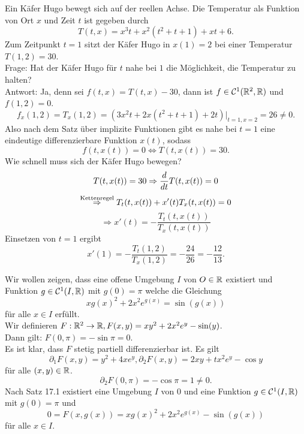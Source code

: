 \documentclass[../ana2u.tex]{subfiles}
\begin{document}
\begin{bsp}
    Ein Käfer Hugo bewegt sich auf der reellen Achse. Die Temperatur 
    als Funktion von Ort \(x\) und Zeit \(t\) ist gegeben durch
    \[ T(t,x) = x^3t+x^2(t^2+t+1)+xt+6. \]
    Zum Zeitpunkt \( t=1 \) sitzt der Käfer Hugo in \( x(1) = 2 \) 
    bei einer Temperatur \(T(1,2) = 30\).\\
    Frage: Hat der Käfer Hugo für \(t\) nahe bei \(1\) die Möglichkeit,
    die Temperatur zu halten?\\
    Antwort: Ja, denn sei \(f(t,x) = T(t,x) - 30\), dann ist
    \(f \in \mathcal{C}^1(\mathbb{R}^2, \mathbb{R}) \) und \(f(1,2) = 0\).
    \[ f_x(1,2) = T_x(1,2) = (3x^2t + 2x(t^2+t+1)+2t)\vert_{t=1, x=2} = 26 \neq 0. \]
    Also nach dem Satz über implizite Funktionen gibt es nahe bei
    \(t=1\) eine eindeutige differenzierbare Funktion \(x(t)\), sodass
    \[ f(t, x(t)) = 0 \Leftrightarrow T(t, x(t)) = 30. \]
    Wie schnell muss sich der Käfer Hugo bewegen?
    \[ T(t,x(t)) = 30 \Rightarrow \frac{d}{dt} T(t,x(t)) = 0 \]
    \[ \overset{\text{Kettenregel}}{\Rightarrow} T_t(t,x(t)) + x'(t)T_x(t,x(t)) = 0 \]
    \[ \Rightarrow x'(t) = -\frac{T_t(t,x(t))}{T_x(t,x(t))} \]
    Einsetzen von \(t=1\) ergibt 
    \[ x'(1) = - \frac{T_t(1,2)}{T_x(1,2)} = - \frac{24}{26} = -\frac{12}{13}. \]
\end{bsp}
\begin{bsp}
    Wir wollen zeigen, dass eine offene Umgebung \(I\) von \(O \in \mathbb{R}\)
    existiert und Funktion \( g \in \mathcal{C}^1(I, \mathbb{R}) \)
    mit \(g(0) = \pi\) welche die Gleichung
    \[ xg(x)^2 + 2x^2 e^{g(x)} = \sin(g(x)) \]
    für alle \(x \in I\) erfüllt.\\
    Wir definieren \( F:\mathbb{R}^2\rightarrow \mathbb{R}, F(x,y) = xy^2 + 2x^2 e^y - \sin(y) \).\\
    Dann gilt: \( F(0, \pi) = -\sin \pi = 0 \).\\
    Es ist klar, dass \( F \) stetig partiell differenzierbar ist.
    Es gilt 
    \[ \partial_1 F(x,y) = y^2+4xe^y, \partial_2 F(x,y) = 2xy+tx^2e^y-\cos y \]
    für alle \( (x,y) \in \mathbb{R} \).
    \[ \partial_2 F(0, \pi) = -\cos \pi = 1 \neq 0. \]
    Nach Satz 17.1 existiert eine Umgebung \(I\) von \(0\) 
    und eine Funktion \( g \in \mathcal{C}^1(I,\mathbb{R}) \) mit 
    \( g(0) = \pi \) und 
    \[ 0 = F(x,g(x)) = xg(x)^2 + 2x^2 e^{g(x)} - \sin(g(x)) \]
    für alle \(x \in I\).
\end{bsp}
\end{document}
